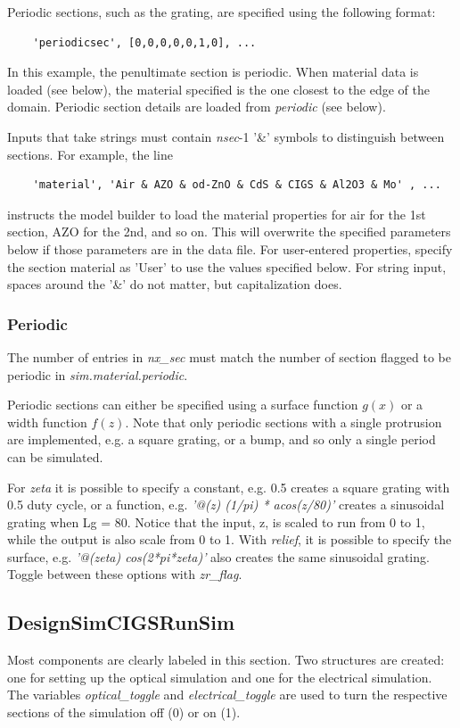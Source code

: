 \documentclass[10pt]{article}
\begin{document}
Periodic sections, such as the grating, are specified using the following format:
\begin{verbatim}
	'periodicsec', [0,0,0,0,0,1,0], ...
\end{verbatim}
In this example, the penultimate section is periodic. When material data is loaded (see below), the material specified is the one closest to the edge of the domain. Periodic section details are loaded from \emph{periodic} (see below).

Inputs that take strings must contain \emph{nsec}-1 '\&' symbols to distinguish between sections. For example, the line
\begin{verbatim}
	'material', 'Air & AZO & od-ZnO & CdS & CIGS & Al2O3 & Mo' , ... 
\end{verbatim}
instructs the model builder to load the material properties for air for the 1st section, AZO for the 2nd, and so on. This will overwrite the specified parameters below if those parameters are in the data file. For user-entered properties, specify the section material as 'User' to use the values specified below. For string input, spaces around the '\&' do not matter, but capitalization does.


\subsubsection{Periodic}
The number of entries in \emph{nx\_sec} must match the number of section flagged to be periodic in \emph{sim.material.periodic}.

Periodic sections can either be specified using a surface function $g(x)$ or a width function $f(z)$. Note that only periodic sections with a single protrusion are implemented, e.g. a square grating, or a bump, and so only a single period can be simulated.

For \emph{zeta} it is possible to specify a constant, e.g. 0.5 creates a square grating with 0.5 duty cycle, or a function, e.g. \emph{'@(z) (1/pi) * acos(z/80)'} creates a sinusoidal grating when Lg = 80. Notice that the input, z, is scaled to run from 0 to 1, while the output is also scale from 0 to 1. With \emph{relief}, it is possible to specify the surface, e.g. \emph{'@(zeta) cos(2*pi*zeta)'} also creates the same sinusoidal grating. Toggle between these options with \emph{zr\_flag}.


\subsection{DesignSimCIGSRunSim}
Most components are clearly labeled in this section. Two structures are created: one for setting up the optical simulation and one for the electrical simulation. The variables \emph{optical\_toggle} and \emph{electrical\_toggle} are used to turn the respective sections of the simulation off (0) or on (1).
\end{document}
